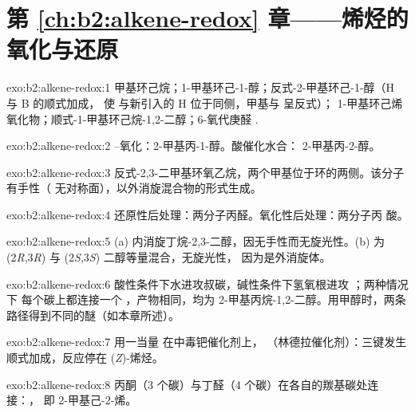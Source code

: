 \section*{第 \ref{ch:b2:alkene-redox} 章——烯烃的氧化与还原}

\begin{solution}{exo:b2:alkene-redox:1}
甲基环己烷；1-甲基环己-1-醇；反式-2-甲基环己-1-醇（H 与 B 的顺式加成，
使  与新引入的 H 位于同侧，甲基与  呈反式）；
1-甲基环己烯氧化物；顺式-1-甲基环己烷-1,2-二醇；6-氧代庚醛
.
\end{solution}

\begin{solution}{exo:b2:alkene-redox:2}
–氧化：2-甲基丙-1-醇。酸催化水合：
2-甲基丙-2-醇。
\end{solution}

\begin{solution}{exo:b2:alkene-redox:3}
反式-2,3-二甲基环氧乙烷，两个甲基位于环的两侧。该分子有手性（
无对称面），以外消旋混合物的形式生成。
\end{solution}

\begin{solution}{exo:b2:alkene-redox:4}
还原性后处理：两分子丙醛。氧化性后处理：两分子丙
酸。
\end{solution}

\begin{solution}{exo:b2:alkene-redox:5}
(a) 内消旋丁烷-2,3-二醇，因无手性而无旋光性。(b) 为
(2\textit{R},3\textit{R}) 与 (2\textit{S},3\textit{S}) 二醇等量混合，无旋光性，
因为是外消旋体。
\end{solution}

\begin{solution}{exo:b2:alkene-redox:6}
酸性条件下水进攻叔碳，碱性条件下氢氧根进攻 ；两种情况下
每个碳上都连接一个 ，产物相同，均为 2-甲基丙烷-1,2-二醇。用甲醇时，两条
路径得到不同的醚（如本章所述）。
\end{solution}

\begin{solution}{exo:b2:alkene-redox:7}
用一当量  在中毒钯催化剂上，
（林德拉催化剂）：三键发生顺式加成，反应停在 (\textit{Z})-烯烃。
\end{solution}

\begin{solution}{exo:b2:alkene-redox:8}
丙酮（3 个碳）与丁醛（4 个碳）在各自的羰基碳处连接：，
即 2-甲基己-2-烯。
\end{solution}

